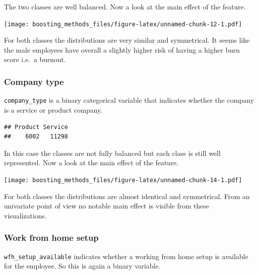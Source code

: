 \documentclass[
]{book}
\newenvironment{Shaded}{\begin{snugshade}}{\end{snugshade}}
\newcommand{\CommentTok}[1]{\textcolor[rgb]{0.56,0.35,0.01}{\textit{#1}}}
\newcommand{\FunctionTok}[1]{\textcolor[rgb]{0.00,0.00,0.00}{#1}}
\newcommand{\NormalTok}[1]{#1}
\newcommand{\SpecialCharTok}[1]{\textcolor[rgb]{0.00,0.00,0.00}{#1}}
\begin{document}
The two classes are well balanced. Now a look at the main effect of the feature.

\texttt{[image: boosting\_methods\_files/figure-latex/unnamed-chunk-12-1.pdf]}

For both classes the distributions are very similar and symmetrical. It seems like the male employees have overall a slightly higher risk of having a higher burn score i.e.~a burnout.

\hypertarget{company-type}{%
\subsubsection{Company type}\label{company-type}}

\texttt{company\_type} is a binary categorical variable that indicates whether the company is a service or product company.

\begin{Shaded}
\end{Shaded}

\begin{verbatim}
## Product Service 
##    6002   11298
\end{verbatim}

In this case the classes are not fully balanced but each class is still well represented. Now a look at the main effect of the feature.

\texttt{[image: boosting\_methods\_files/figure-latex/unnamed-chunk-14-1.pdf]}

For both classes the distributions are almost identical and symmetrical. From an univariate point of view no notable main effect is visible from these visualizations.

\hypertarget{work-from-home-setup}{%
\subsubsection{Work from home setup}\label{work-from-home-setup}}

\texttt{wfh\_setup\_available} indicates whether a working from home setup is available for the employee. So this is again a binary variable.

\begin{Shaded}
\end{Shaded}
\end{document}
